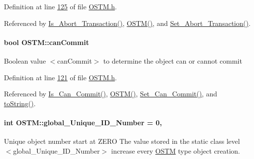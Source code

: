 Definition at line \hyperlink{_o_s_t_m_8h_source_l00125}{125} of file \hyperlink{_o_s_t_m_8h_source}{O\+S\+T\+M.\+h}.



Referenced by \hyperlink{_o_s_t_m_8cpp_source_l00140}{Is\+\_\+\+Abort\+\_\+\+Transaction()}, \hyperlink{_o_s_t_m_8cpp_source_l00021}{O\+S\+T\+M()}, and \hyperlink{_o_s_t_m_8cpp_source_l00132}{Set\+\_\+\+Abort\+\_\+\+Transaction()}.

\paragraph[{\texorpdfstring{can\+Commit}{canCommit}}]{\setlength{\rightskip}{0pt plus 5cm}bool O\+S\+T\+M\+::can\+Commit\hspace{0.3cm}{\ttfamily [private]}}\hypertarget{class_o_s_t_m_a2a5b89641af274ddc69bdf8c1c1a07d6_a2a5b89641af274ddc69bdf8c1c1a07d6}{}\label{class_o_s_t_m_a2a5b89641af274ddc69bdf8c1c1a07d6_a2a5b89641af274ddc69bdf8c1c1a07d6}
Boolean value $<$can\+Commit$>$ to determine the object can or cannot commit 

Definition at line \hyperlink{_o_s_t_m_8h_source_l00121}{121} of file \hyperlink{_o_s_t_m_8h_source}{O\+S\+T\+M.\+h}.



Referenced by \hyperlink{_o_s_t_m_8cpp_source_l00124}{Is\+\_\+\+Can\+\_\+\+Commit()}, \hyperlink{_o_s_t_m_8cpp_source_l00021}{O\+S\+T\+M()}, \hyperlink{_o_s_t_m_8cpp_source_l00117}{Set\+\_\+\+Can\+\_\+\+Commit()}, and \hyperlink{_o_s_t_m_8h_source_l00051}{to\+String()}.

\paragraph[{\texorpdfstring{global\+\_\+\+Unique\+\_\+\+I\+D\+\_\+\+Number}{global_Unique_ID_Number}}]{\setlength{\rightskip}{0pt plus 5cm}int O\+S\+T\+M\+::global\+\_\+\+Unique\+\_\+\+I\+D\+\_\+\+Number = 0\hspace{0.3cm}{\ttfamily [static]}, {\ttfamily [private]}}\hypertarget{class_o_s_t_m_acb617b9666d198c0de333c8613df0d4b_acb617b9666d198c0de333c8613df0d4b}{}\label{class_o_s_t_m_acb617b9666d198c0de333c8613df0d4b_acb617b9666d198c0de333c8613df0d4b}
Unique object number start at Z\+E\+RO The value stored in the static class level $<$global\+\_\+\+Unique\+\_\+\+I\+D\+\_\+\+Number$>$ increase every \hyperlink{class_o_s_t_m}{O\+S\+TM} type object creation. 

